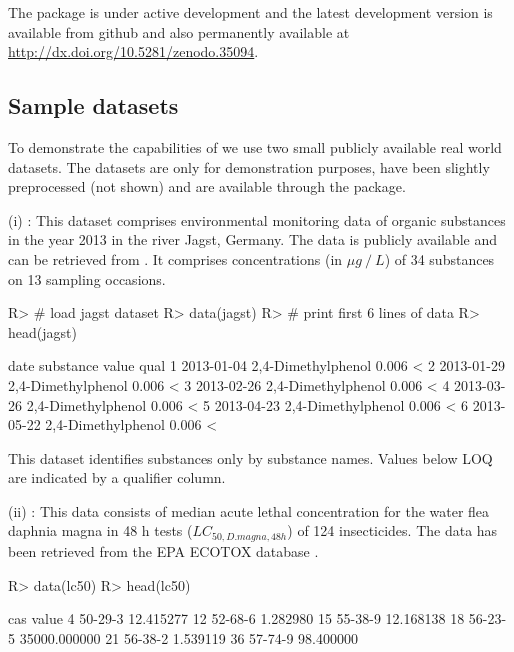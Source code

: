 \documentclass[article, shortnames]{jss}\usepackage[]{graphicx}\usepackage[]{color}
\begin{document}
The package is under active development and the latest development version is available from github and also permanently available at \url{http://dx.doi.org/10.5281/zenodo.35094}.


\subsection[Sample datasets]{Sample datasets}
To demonstrate the capabilities of   we use two small publicly available real world datasets.
The datasets are only for demonstration purposes, have been slightly preprocessed (not shown) and are available through the package.

(i) : This dataset comprises environmental monitoring data of organic substances in the year 2013 in the river Jagst, Germany.
The data is publicly available and can be retrieved from \citep{lubw_2016}.
It comprises concentrations  (in $\mu g~/~L$) of  34 substances  on 13 sampling occasions.

\begin{CodeChunk}
\begin{CodeInput}
R> # load jagst dataset
R> data(jagst)
R> # print first 6 lines of data
R> head(jagst)
\end{CodeInput}
\begin{CodeOutput}
        date          substance value qual
1 2013-01-04 2,4-Dimethylphenol 0.006    <
2 2013-01-29 2,4-Dimethylphenol 0.006    <
3 2013-02-26 2,4-Dimethylphenol 0.006    <
4 2013-03-26 2,4-Dimethylphenol 0.006    <
5 2013-04-23 2,4-Dimethylphenol 0.006    <
6 2013-05-22 2,4-Dimethylphenol 0.006    <
\end{CodeOutput}
\end{CodeChunk}

This dataset identifies substances only by substance names. Values below LOQ are indicated by a qualifier column.

(ii) : This data consists of median acute lethal concentration for the water flea daphnia magna in 48 h tests ($LC_{50, D.magna, 48h}$) of 124 insecticides.
The data has been retrieved from the EPA ECOTOX database \citep{epa_2016}.

\begin{CodeChunk}
\begin{CodeInput}
R> data(lc50)
R> head(lc50)
\end{CodeInput}
\begin{CodeOutput}
       cas        value
4  50-29-3    12.415277
12 52-68-6     1.282980
15 55-38-9    12.168138
18 56-23-5 35000.000000
21 56-38-2     1.539119
36 57-74-9    98.400000
\end{CodeOutput}
\end{CodeChunk}
\end{document}
